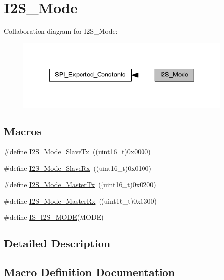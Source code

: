 \hypertarget{group___i2_s___mode}{}\section{I2\+S\+\_\+\+Mode}
\label{group___i2_s___mode}
Collaboration diagram for I2\+S\+\_\+\+Mode\+:
\nopagebreak
\begin{figure}[H]
\begin{center}
\leavevmode
\includegraphics[width=302pt]{group___i2_s___mode}
\end{center}
\end{figure}
\subsection*{Macros}
\begin{DoxyCompactItemize}
\item 
\#define \hyperlink{group___i2_s___mode_gadd5b20277198fcdb6aa53ea48e802ae5}{I2\+S\+\_\+\+Mode\+\_\+\+Slave\+Tx}~((uint16\+\_\+t)0x0000)
\item 
\#define \hyperlink{group___i2_s___mode_gaaf62ee0353476afc9612dc2933e1c5c5}{I2\+S\+\_\+\+Mode\+\_\+\+Slave\+Rx}~((uint16\+\_\+t)0x0100)
\item 
\#define \hyperlink{group___i2_s___mode_ga3a62ee8964033a3f6fd030da9e40fba6}{I2\+S\+\_\+\+Mode\+\_\+\+Master\+Tx}~((uint16\+\_\+t)0x0200)
\item 
\#define \hyperlink{group___i2_s___mode_gabf9f872cda7c0f159c5fc18aed44e973}{I2\+S\+\_\+\+Mode\+\_\+\+Master\+Rx}~((uint16\+\_\+t)0x0300)
\item 
\#define \hyperlink{group___i2_s___mode_ga942c37b2c1274c4c5773ddcf8b46d9b5}{I\+S\+\_\+\+I2\+S\+\_\+\+M\+O\+DE}(M\+O\+DE)
\end{DoxyCompactItemize}


\subsection{Detailed Description}


\subsection{Macro Definition Documentation}
\mbox{\label{group___i2_s___mode_gabf9f872cda7c0f159c5fc18aed44e973}} 
